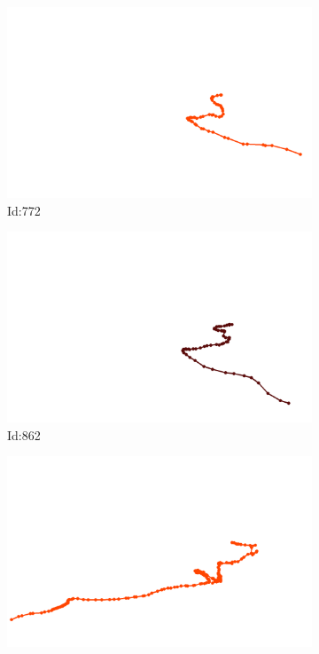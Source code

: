 \documentclass[12pt,twoside]{report}
\begin{document}
\begin{figure}
\begin{subfigure}[b]{0.20\textwidth}
\centering
\includegraphics[width=\textwidth]{../trajectories/772.png}
\caption{Id:772}
\end{subfigure}
\begin{subfigure}[b]{0.20\textwidth}
\centering
\includegraphics[width=\textwidth]{../trajectories/862.png}
\caption{Id:862}
\end{subfigure}
\begin{subfigure}[b]{0.20\textwidth}
\centering
\includegraphics[width=\textwidth]{../trajectories/933.png}

\end{subfigure}
\end{figure}
\end{document}
